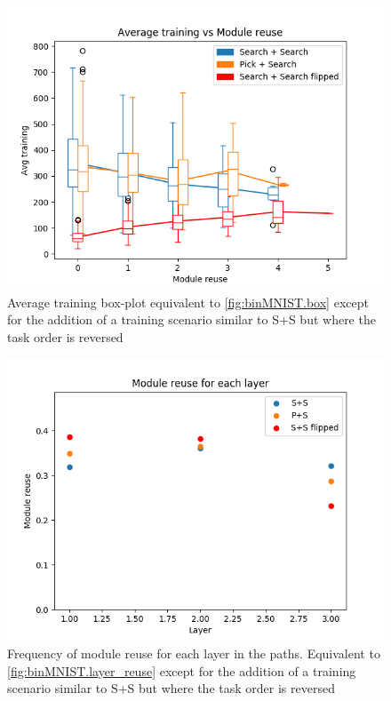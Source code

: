 \begin{figure}[t]
    \includegraphics[width=\textwidth]{Chapters/4.Experiments/exp1/figures/535MNIST_training_boxplot.png}
    \caption{Average training box-plot equivalent to \ref{fig:binMNIST.box} except for the addition of a training scenario similar to S+S but where the task order is reversed}
    \label{fig:quinMNIST.box}
\end{figure}

\begin{figure}[t]
    \includegraphics[width=\textwidth]{Chapters/4.Experiments/exp1/figures/535MNIST_reuse_by_layer.png}
    \caption{Frequency of module reuse for each layer in the paths. Equivalent to \ref{fig:binMNIST.layer_reuse} except for the addition of a training scenario similar to S+S but where the task order is reversed}
    \label{fig:quinMNIST.layer_reuse}
\end{figure}


